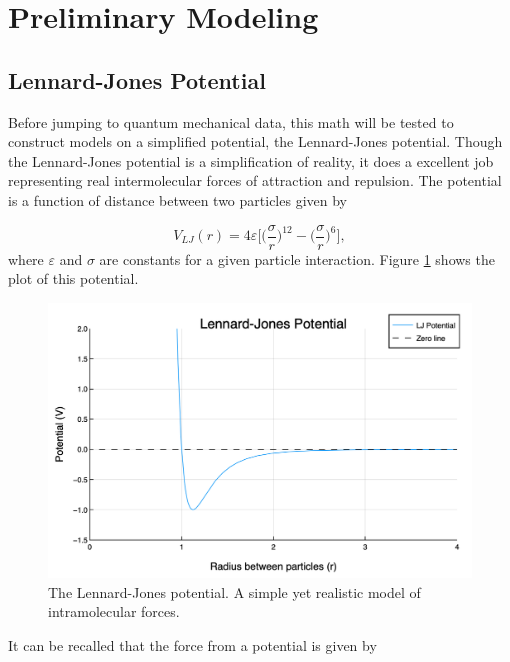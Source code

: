 \section{Preliminary Modeling}\label{Sect:modelPrep}

\subsection{Lennard-Jones Potential}\label{Sect:LJPotential}
Before jumping to quantum mechanical data, this math will be tested to construct models on a simplified potential, the Lennard-Jones potential. Though the Lennard-Jones potential is a simplification of reality, it does a excellent job representing real intermolecular forces of attraction and repulsion. The potential is a function of distance between two particles given by

\begin{equation} \label{LJ}
V_{LJ}(r) = 4\varepsilon \bigg[\Big(\frac{\sigma}{r}\Big)^{12} - \Big(\frac{\sigma}{r}\Big)^6\bigg],
\end{equation}
where $\varepsilon$ and $\sigma$ are constants for a given particle interaction. Figure \ref{figLJ} shows the plot of this potential.

\begin{figure}[h]
\includegraphics[scale = 0.4]{Figures/LJPotential}
\caption{The Lennard-Jones potential. A simple yet realistic model of intramolecular forces.
\label{figLJ}} 
\end{figure}

\par It can be recalled that the force from a potential is given by

